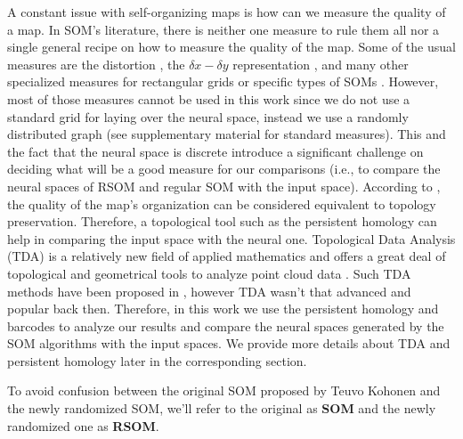 A constant issue with self-organizing maps is how can we measure the quality of a map. In SOM's literature, there is neither one measure to rule them all nor a single general recipe on how to measure the quality of the map. Some of the usual measures are the distortion \cite{rynkiewicz:2008}, the $\delta x - \delta y$ representation \citep{Demartines:1992}, and many other specialized measures for rectangular grids or specific types of SOMs \citep{Polani2002}. However, most of those measures cannot be used in this work since we do not use a standard grid for laying over the neural space, instead we use a randomly distributed graph (see supplementary material for standard measures). This and the fact that the neural space is discrete introduce a significant challenge on deciding what will be a good measure for our comparisons \citep{Polani2002} (i.e., to compare the neural spaces of RSOM and regular SOM with the input space). According to \citep{Polani2002}, the quality of the map's organization can be considered equivalent to topology preservation. Therefore, a topological tool such as the persistent homology can help in comparing the input space with the neural one. Topological Data Analysis (TDA) is a relatively new field of applied mathematics and offers a great deal of topological and geometrical tools to analyze point cloud data \citep{Carlsson:2009,HerculanoHouzel:2013}. Such TDA methods have been proposed in \citep{Polani2002}, however TDA wasn't that advanced and popular back then. Therefore, in this work we use the persistent homology and barcodes to analyze our results and compare the neural spaces generated by the SOM algorithms with the input spaces. We provide more details about TDA and persistent homology later in the corresponding section.

To avoid confusion between the original SOM proposed by Teuvo Kohonen and the newly randomized SOM, we'll refer to the original as \textbf{SOM} and the newly randomized one as \textbf{RSOM}.



